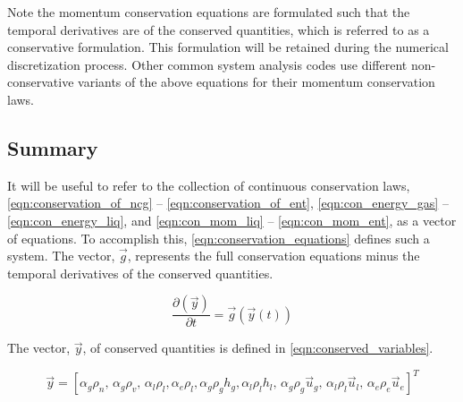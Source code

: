 Note the momentum conservation equations are formulated such that the temporal derivatives are of the conserved quantities, which is referred to as a conservative formulation.
This formulation will be retained during the numerical discretization process.
Other common system analysis codes \cite{TRACE, RELAP} use different non-conservative variants of the above equations for their momentum conservation laws.

\subsection{Summary}
\label{subsect:summary}

It will be useful to refer to the collection of continuous conservation laws, \eqref{eqn:conservation_of_ncg} -- \eqref{eqn:conservation_of_ent}, \eqref{eqn:con_energy_gas} -- \eqref{eqn:con_energy_liq}, and \eqref{eqn:con_mom_liq} -- \eqref{eqn:con_mom_ent}, as a vector of equations.
To accomplish this, \eqref{eqn:conservation_equations} defines such a system.
The vector, $\vec{g}$, represents the full conservation equations minus the temporal derivatives of the conserved quantities.

\begin{equation}
\label{eqn:conservation_equations}
\frac{\partial \left( \vec{y} \right)}{\partial t} = \vec{g}(\vec{y}(t))
\end{equation}

The vector, $\vec{y}$, of conserved quantities is defined in \eqref{eqn:conserved_variables}.

\begin{equation}
\label{eqn:conserved_variables}
\vec{y} = [\alpha_g \rho_n,\, \alpha_g \rho_v,\, \alpha_l \rho_l, \alpha_e \rho_l, \alpha_g \rho_g h_g, \alpha_l \rho_l h_l,\, \alpha_g \rho_g \vec{u}_g,\, \alpha_l \rho_l \vec{u}_l,\, \alpha_e \rho_e \vec{u}_e]^{T}
\end{equation}

